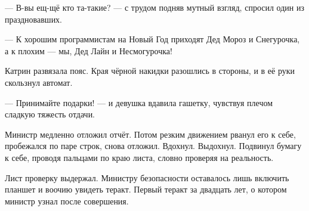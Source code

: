  --- В-вы ещ-щё кто та-такие? --- с трудом подняв мутный взгляд, спросил один из праздновавших.

 --- К хорошим программистам на Новый Год приходят Дед Мороз и Снегурочка, а к плохим --- мы,
 Дед Лайн и Несмогурочка!

 Катрин развязала пояс. Края чёрной накидки разошлись в стороны, и в её руки скользнул автомат.

  --- Принимайте подарки! --- и девушка вдавила гашетку, чувствуя плечом сладкую тяжесть отдачи.

\emptypar



Министр медленно отложил отчёт. Потом резким движением рванул его к себе, пробежался по паре строк, снова отложил.
Вдохнул. Выдохнул. Подвинул бумагу к себе, проводя пальцами по краю листа, словно проверяя на реальность.

Лист проверку выдержал.
Министру безопасности оставалось лишь включить планшет и воочию увидеть теракт.
Первый теракт за двадцать лет, о котором министр узнал после совершения.






